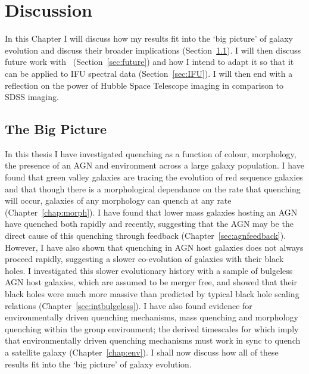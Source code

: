 \chapter{Discussion}\label{chap:discussion}

In this Chapter I will discuss how my results fit into the `big picture' of galaxy evolution and discuss their broader implications (Section~\ref{sec:bigpic}). I will then discuss future work with \starpy\ (Section~\ref{sec:future}) and how I intend to adapt it so that it can be applied to IFU spectral data (Section~\ref{sec:IFU}). I will then end with a reflection on the power of Hubble Space Telescope imaging in comparison to SDSS imaging. 


\section{The Big Picture}\label{sec:bigpic}

In this thesis I have investigated quenching as a function of colour, morphology, the presence of an AGN and environment across a large galaxy population. I have found that green valley galaxies are tracing the evolution of red sequence galaxies and that though there is a morphological dependance on the rate that quenching will occur, galaxies of any morphology can quench at any rate (Chapter~\ref{chap:morph}). I have found that lower mass galaxies hosting an AGN have quenched both rapidly and recently, suggesting that the AGN may be the direct cause of this quenching through feedback (Chapter~\ref{sec:agnfeedback}). However, I have also shown that quenching in AGN host galaxies does not always proceed rapidly, suggesting a slower co-evolution of galaxies with their black holes. I investigated this slower evolutionary history with a sample of bulgeless AGN host galaxies, which are assumed to be merger free, and showed that their black holes were much more massive than predicted by typical black hole scaling relations (Chapter~\ref{sec:intbulgeless}). I have also found evidence for environmentally driven quenching mechanisms, mass quenching and morphology quenching within the group environment; the derived timescales for which imply that environmentally driven quenching mechanisms must work in sync to quench a satellite galaxy (Chapter~\ref{chap:env}). I shall now discuss how all of these results fit into the `big picture' of galaxy evolution. 

